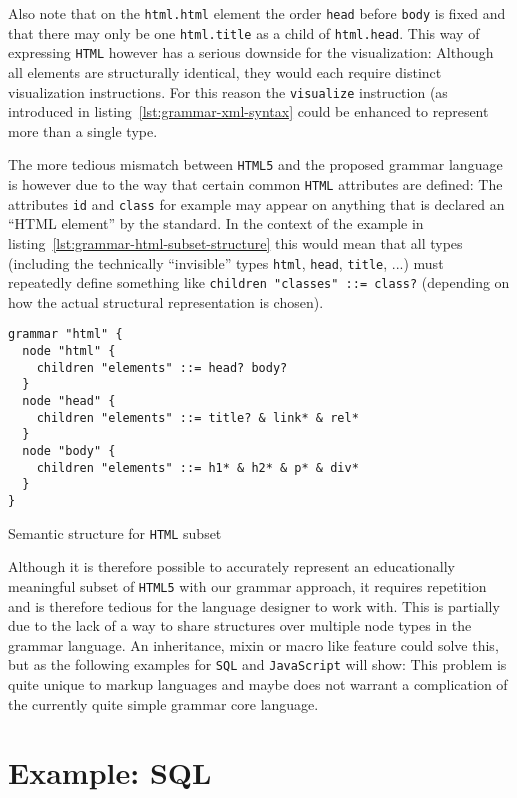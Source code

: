 \documentclass[sigconf,natbib=false,review=true,anonymous]{acmart}
\begin{document}
Also note that on the \texttt{html.html} element the order \texttt{head} before \texttt{body} is fixed and that there may only be one \texttt{html.title} as a child of \texttt{html.head}. This way of expressing \texttt{HTML} however has a serious downside for the visualization: Although all elements are structurally identical, they would each require distinct visualization instructions. For this reason the \texttt{visualize} instruction (as introduced in listing~\ref{lst:grammar-xml-syntax} could be enhanced to represent more than a single type.

The more tedious mismatch between \texttt{HTML5} and the proposed grammar language is however due to the way that certain common \texttt{HTML} attributes are defined: The attributes \texttt{id} and \texttt{class} for example may appear on anything that is declared an \enquote{HTML element} by the standard\cite[.3]{whatwg_html_2022}. In the context of the example in listing~\ref{lst:grammar-html-subset-structure} this would mean that all types (including the technically \enquote{invisible} types \texttt{html}, \texttt{head}, \texttt{title}, ...) must repeatedly define something like \texttt{children "classes" ::= class?} (depending on how the actual structural representation is chosen).

\begin{listing}[H]
\begin{verbatim}
grammar "html" {
  node "html" {
    children "elements" ::= head? body?
  }
  node "head" {
    children "elements" ::= title? & link* & rel*
  }
  node "body" {
    children "elements" ::= h1* & h2* & p* & div*
  }
}
\end{verbatim}
\caption{Semantic structure for \texttt{HTML} subset}
\label{lst:grammar-html-subset-structure}
\end{listing}

Although it is therefore possible to accurately represent an educationally meaningful subset of \texttt{HTML5} with our grammar approach, it requires repetition and is therefore tedious for the language designer to work with. This is partially due to the lack of a way to share structures over multiple node types in the grammar language. An inheritance, mixin or macro like feature could solve this, but as the following examples for \texttt{SQL} and \texttt{JavaScript} will show: This problem is quite unique to markup languages and maybe does not warrant a complication of the currently quite simple grammar core language.

\section{Example: SQL}
\end{document}
